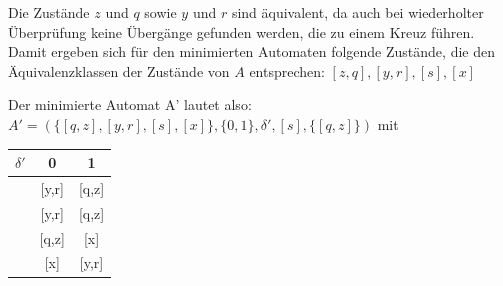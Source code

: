 	Die Zustände $z$ und $q$ sowie $y$ und $r$ sind äquivalent, da auch bei wiederholter Überprüfung keine Übergänge gefunden werden, die zu einem Kreuz führen. Damit ergeben sich für den minimierten Automaten folgende Zustände, die den Äquivalenzklassen der Zustände von $A$ entsprechen: $[z,q],[y,r],[s],[x]$
	
	Der minimierte Automat A' lautet also: \\
	$A' = (\{[q,z],[y,r],[s],[x]\},\{0,1\},\delta',[s],\{[q,z]\})$ mit

	\begin{tabular}{c|c|c}
		$\delta'$ & 0 & 1 \\
		\hline
		[s]       & [y,r]      & [q,z] 	\\
		\hline
		[x]       & [y,r]      & [q,z]	\\
		\hline
		[y,r]     & [q,z]      & [x]	\\
		\hline
		[q,z]     & [x]        & [y,r]	\\
	\end{tabular}


\newpage